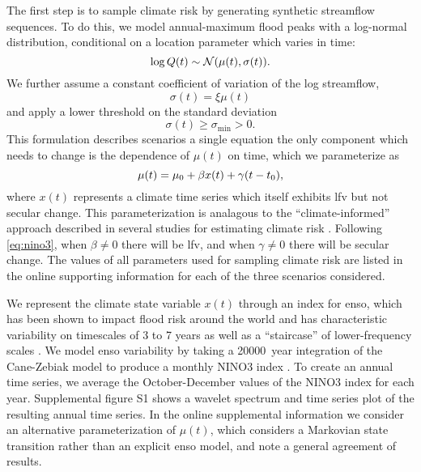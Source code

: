 \documentclass[
  draft,
  linenumbers
]{agujournal2019}
\begin{document}
The first step is to sample climate risk by generating synthetic streamflow sequences.
To do this, we model  annual-maximum flood peaks with a log-normal distribution, conditional on a location parameter which varies in time:
\begin{equation} \label{eq:log-normal}
  \log Q(t) \sim \mathcal{N} \qty(\mu(t), \sigma(t)).
\end{equation}
We further assume a constant coefficient of variation of the log streamflow,
\begin{equation}
  \sigma(t) = \xi \mu(t)  
\end{equation}
and apply a lower threshold on the standard deviation
\begin{equation}
  \sigma(t) \geq \sigma_\text{min} > 0.
\end{equation}
This formulation describes  scenarios   a single equation\remove{;}
 the only component which needs to change is the dependence of $\mu(t)$ on time, which we parameterize as
\begin{equation}\label{eq:nino3}
  \mu(t) = \mu_0 + \beta x(t) + \gamma \qty(t - t_0),
\end{equation}
where $x(t)$ represents a climate time series which itself exhibits \gls{lfv} but not secular change.
This parameterization is analagous to the ``climate-informed'' approach described in several studies for estimating climate risk \citep{Delgado:2014ey,Merz:2014gf,Farnham:2018gs}.
Following \cref{eq:nino3}, when $\beta \neq 0$ there will be \gls{lfv}, and when $\gamma \neq 0$ there will be secular change.
The values of all parameters used for sampling climate risk are listed in the online supporting information for each of the three scenarios considered.

We represent the climate state variable $x(t)$ through an index for \gls{enso}, which has been shown to impact flood risk around the world \citep{Ropelewski:1987do, Ward:2014gg} and has characteristic variability on timescales of 3 to 7 years \citep{Sarachik:2009dr} as well as a ``staircase'' of lower-frequency scales \citep{Jin:1994wq}.
We model \gls{enso} variability by taking a \SI{20000}{year} integration of the Cane-Zebiak model \citep{Zebiak:1987cl} to produce a monthly NINO3 index \citep{Ramesh:2016hf}.
To create an annual time series, we average the October-December values of the NINO3 index for each year.
Supplemental figure S1 shows a wavelet spectrum and time series plot of the resulting annual time series.
In the online supplemental information we consider an alternative parameterization of $\mu(t)$, \remove{i.e.\@\xspace an alternative to,} which considers a Markovian state transition rather than an explicit \gls{enso} model, and note a general agreement of results.
\end{document}
